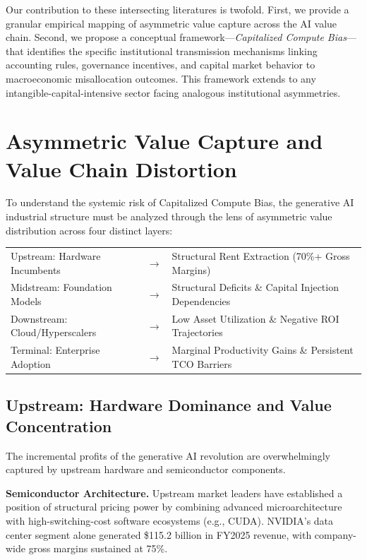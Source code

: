 \documentclass[11pt,letterpaper]{article}
\begin{document}
Our contribution to these intersecting literatures is twofold. First, we provide a granular empirical mapping of asymmetric value capture across the AI value chain. Second, we propose a conceptual framework---\textit{Capitalized Compute Bias}---that identifies the specific institutional transmission mechanisms linking accounting rules, governance incentives, and capital market behavior to macroeconomic misallocation outcomes. This framework extends to any intangible-capital-intensive sector facing analogous institutional asymmetries.

\section{Asymmetric Value Capture and Value Chain Distortion}

To understand the systemic risk of Capitalized Compute Bias, the generative AI industrial structure must be analyzed through the lens of asymmetric value distribution across four distinct layers:

\begin{center}
\begin{tabular}{lcl}
Upstream: Hardware Incumbents   & $\rightarrow$ & Structural Rent Extraction (70\%+ Gross Margins) \\
Midstream: Foundation Models    & $\rightarrow$ & Structural Deficits \& Capital Injection Dependencies \\
Downstream: Cloud/Hyperscalers  & $\rightarrow$ & Low Asset Utilization \& Negative ROI Trajectories \\
Terminal: Enterprise Adoption   & $\rightarrow$ & Marginal Productivity Gains \& Persistent TCO Barriers
\end{tabular}
\end{center}

\subsection{Upstream: Hardware Dominance and Value Concentration}

The incremental profits of the generative AI revolution are overwhelmingly captured by upstream hardware and semiconductor components.

\textbf{Semiconductor Architecture.} Upstream market leaders have established a position of structural pricing power by combining advanced microarchitecture with high-switching-cost software ecosystems (e.g., CUDA). NVIDIA's data center segment alone generated \$115.2 billion in FY2025 revenue, with company-wide gross margins sustained at 75\%.
\end{document}
